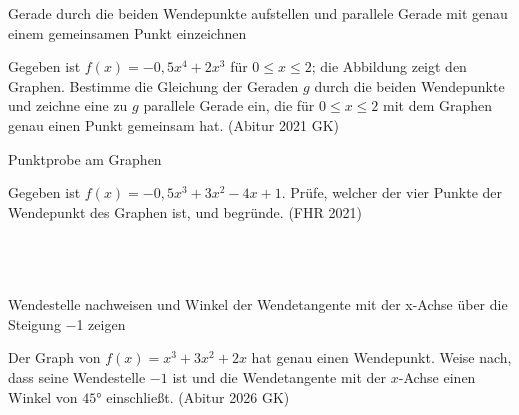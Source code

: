 \begin{aufgabe}{Gerade durch die beiden Wendepunkte aufstellen und parallele Gerade mit genau einem gemeinsamen Punkt einzeichnen}
\begin{teile}
\teil Gegeben ist $f(x) = -0{,}5x^4 + 2x^3$ für $0 \le x \le 2$; die Abbildung zeigt den Graphen. Bestimme die Gleichung der Geraden $g$ durch die beiden Wendepunkte und zeichne eine zu $g$ parallele Gerade ein, die für $0 \le x \le 2$ mit dem Graphen genau einen Punkt gemeinsam hat. \hfill (Abitur 2021 GK)

\begin{ksys}[xmin=-1,xmax=3,ymin=-3,ymax=9,ystep=2]  \end{ksys}
\end{teile}
\end{aufgabe}

\begin{aufgabe}{Punktprobe am Graphen}
\begin{teile}
\teil Gegeben ist $f(x) = -0{,}5x^3 + 3x^2 - 4x + 1$. Prüfe, welcher der vier Punkte der Wendepunkt des Graphen ist, und begründe. \hfill (FHR 2021) \\  \\  \\  \\ 
\end{teile}
\end{aufgabe}

\begin{aufgabe}{Wendestelle nachweisen und Winkel der Wendetangente mit der x-Achse über die Steigung −1 zeigen}
\begin{teile}
\teil Der Graph von $f(x) = x^3 + 3x^2 + 2x$ hat genau einen Wendepunkt. Weise nach, dass seine Wendestelle $-1$ ist und die Wendetangente mit der $x$-Achse einen Winkel von $45°$ einschließt. \hfill (Abitur 2026 GK)
\end{teile}
\end{aufgabe}


